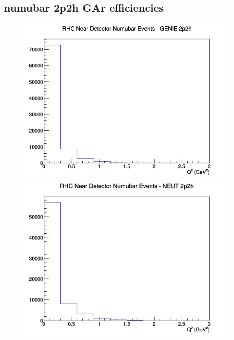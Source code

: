 \documentclass[12pt]{article}
\begin{document}
\subsection{numubar 2p2h GAr efficiencies}
\begin{figure}[h]
\includegraphics[width=\linewidth]{eff_Q2/GAr/2p2h_RHC_ND_numubar_Q2_GENIE.png}
\endminipage
{}
\includegraphics[width=\linewidth]{eff_Q2/GAr/2p2h_RHC_ND_numubar_Q2_NEUT.png}
\endminipage
{}

\end{figure}
\end{document}
